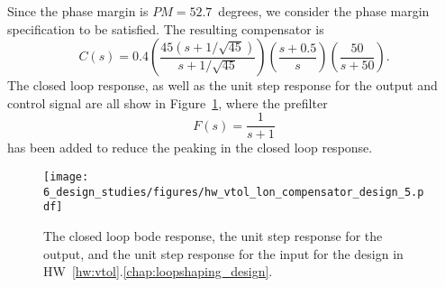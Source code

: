 Since the phase margin is $PM=52.7$~degrees, we consider the phase margin specification to be satisfied.
The resulting compensator is
\[
C(s) = 0.4\left(\frac{45(s+1/\sqrt{45})}{s+1/\sqrt{45}}\right)\left(\frac{s+0.5}{s}\right)\left(\frac{50}{s+50}\right).
\]
The closed loop response, 
as well as the unit step response for the output and control signal are all show in Figure~\ref{fig:hw_vtol_lon_compensator_design_5}, where the prefilter
\[
F(s) = \frac{1}{s+1}
\]
has been added to reduce the peaking in the closed loop response.
\begin{figure}[H]
   \centering
   \texttt{[image: 6\_design\_studies/figures/hw\_vtol\_lon\_compensator\_design\_5.pdf]}
   \caption{The closed loop bode response, the unit step response for the output, and the unit step response for the input for the design in HW~\ref{hw:vtol}.\ref{chap:loopshaping_design}.}
   \label{fig:hw_vtol_lon_compensator_design_5}
\end{figure}

